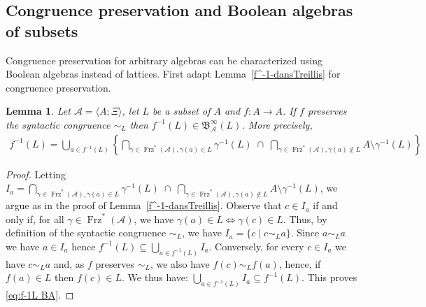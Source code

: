 \documentclass[11pt,a4paper]{article}
\newtheorem{lemma}[theorem]{Lemma}
\theoremstyle{definition} %
\newcommand\+[1]{\mathcal{#1}} %
\newcommand{\Bool}{{\mathfrak{B}}}   %
\DeclareMathOperator{\freez}{Frz}%
\newcommand{\DUO}{{\freez}^*}
\begin{document}
\subsection{Congruence  preservation and   Boolean algebras of subsets}\label{ss cpbool}
Congruence preservation for arbitrary algebras can be characterized using Boolean algebras instead of lattices.  First adapt Lemma~\ref{f^-1-dansTreillis} for congruence preservation.
%
\begin{lemma} \label{f^-1-dansBA} 
Let $\+A=\langle A;\Xi\rangle$, let $L$ be a subset of $A$ and $f:A\to A$. 
If $f$ preserves the syntactic congruence $\sim_L$ then  $f^{-1}(L) \in \Bool_{\+A}^\infty(L)$.
More precisely, 
 \begin{align}\label{eq:f-1L BA}
f^{-1}(L)  =
 \mathop{\bigcup}\limits_{a\in f^{-1}(L)}\left\{ \mathop{\bigcap}\limits_{\gamma\in  {\freez^*}(\+A),\gamma(a)\in L}\gamma^{-1}(L)\;\cap\; \mathop{\bigcap}\limits_{\gamma\in  {\freez^*}(\+A),\gamma(a)\not\in L} A\setminus\gamma^{-1}(L)\right\}
 \end{align}
\end{lemma}

\begin{proof} 
Letting  $I_a= \mathop{\bigcap}\limits_{\gamma\in  {\freez^*}(\+A),\gamma(a)\in L}\gamma^{-1}(L)\;\cap\; \mathop{\bigcap}\limits_{\gamma\in  {\freez^*}(\+A),\gamma(a)\not\in L} A\setminus\gamma^{-1}(L)$, 
we argue as in the proof of Lemma~\ref{f^-1-dansTreillis}.
Observe that $c\in I_a$ if and only if, for all $\gamma\in\DUO(\+A)$, we have
$\gamma(a)\in L\Leftrightarrow\gamma(c)\in L$.
Thus, by definition of the syntactic congruence $\sim_L$, we have
$I_a=\{c\mid c \sim_L a\}$.
Since $a\sim_L a$ we have $a\in I_a$ hence $f^{-1}(L)\subseteq\bigcup_{a\in f^{-1}(L)} I_a$.
Conversely, for every $c\in I_a$ we have $c\sim_L a$ and, as $f$ preserves $\sim_L$,  we also have
$f(c)\sim_L f(a)$, hence, if $f(a)\in L$ then $f(c)\in L$.
We thus have: $\bigcup_{a\in f^{-1}(L)} I_a \subseteq f^{-1}(L)$.
This proves \eqref{eq:f-1L BA}.
\end{proof}
\end{document}
